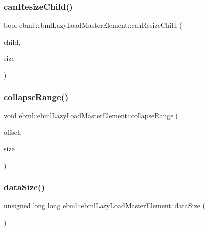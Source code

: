 \subsubsection{\texorpdfstring{can\+Resize\+Child()}{canResizeChild()}\hspace{0.1cm}{\footnotesize\ttfamily [2/2]}}
{\footnotesize\ttfamily bool ebml\+::ebml\+Lazy\+Load\+Master\+Element\+::can\+Resize\+Child (\begin{DoxyParamCaption}\item[{\mbox{\hyperlink{classebml_1_1ebmlElement}{ebml\+Element}} $\ast$}]{child,  }\item[{size\+\_\+t}]{size }\end{DoxyParamCaption})}

\mbox{\label{classebml_1_1ebmlLazyLoadMasterElement_aa562e001271845243cce7941ef438064}} 
\subsubsection{\texorpdfstring{collapse\+Range()}{collapseRange()}}
{\footnotesize\ttfamily void ebml\+::ebml\+Lazy\+Load\+Master\+Element\+::collapse\+Range (\begin{DoxyParamCaption}\item[{unsigned long long}]{offset,  }\item[{size\+\_\+t}]{size }\end{DoxyParamCaption})}

\mbox{\label{classebml_1_1ebmlLazyLoadMasterElement_a85e983901d2d66f042b803a62664d725}} 
\subsubsection{\texorpdfstring{data\+Size()}{dataSize()}}
{\footnotesize\ttfamily unsigned long long ebml\+::ebml\+Lazy\+Load\+Master\+Element\+::data\+Size (\begin{DoxyParamCaption}{ }\end{DoxyParamCaption})}

